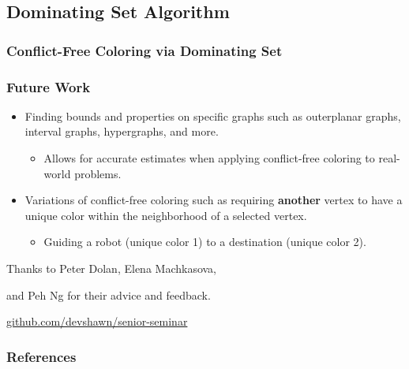 \documentclass[xcolor=dvipsnames,aspectratio=1610]{beamer}
\begin{document}
  \subsection{Dominating Set Algorithm}
  \begin{frame}
    \frametitle{Conflict-Free Coloring via Dominating Set}

    
  \end{frame}

  \begin{frame}
    \frametitle{Future Work}

    \begin{itemize}
      \item Finding bounds and properties on specific graphs such as outerplanar graphs, interval graphs, hypergraphs, and more.
      \pause
      \vfill
      \begin{itemize}
        \item Allows for accurate estimates when applying conflict-free coloring to real-world problems.
      \end{itemize}
      \pause
      \vfill
      \item Variations of conflict-free coloring such as requiring \textbf{another} vertex to have a unique color within the neighborhood of a selected vertex.
      \pause
      \vfill
      \begin{itemize}
        \item Guiding a robot (unique color 1) to a destination (unique color 2).
      \end{itemize}
    \end{itemize}

  \end{frame}

  \begin{frame}[standout]
    \centering
    {Thanks to Peter Dolan, Elena Machkasova,

    and Peh Ng for their advice and feedback.}
    \vfill
    \href{https://github.com/devshawn/senior-seminar}{github.com/devshawn/senior-seminar}
    \vfill
    \ccbyncsa{}
  \end{frame}

  \nocite{*}
  \begin{frame}[t,allowframebreaks]
    \frametitle{References}
    \vspace{-0.6cm}
    \printbibliography
  \end{frame}
\end{document}
